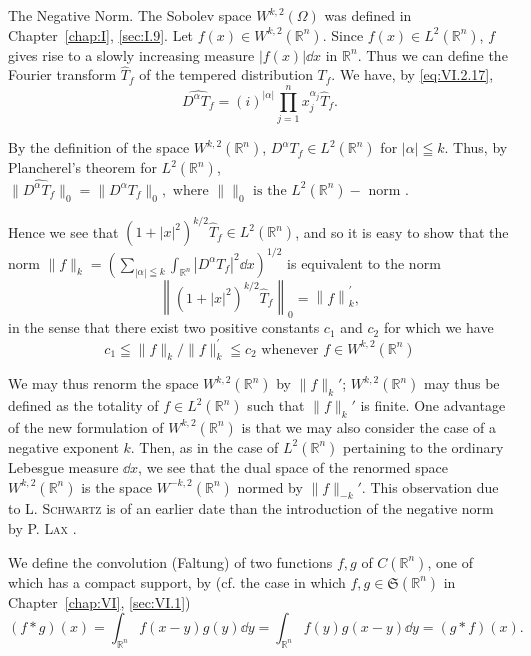 The Negative Norm. The Sobolev space $W^{k,2}(\Omega)$ was defined in Chapter~\ref{chap:I}, \ref{sec:I.9}. Let $f(x) \in W^{k,2}(\mathbb{R}^{n})$. Since $f(x) \in L^2(\mathbb{R}^{n})$, $f$ gives rise to a slowly increasing measure $|f(x)| \dd x$ in $\mathbb{R}^{n}$. Thus we can define the Fourier transform $\hat{T}_f$ of the tempered distribution $T_f$. We have, by \eqref{eq:VI.2.17}, 
\[
\widehat {D ^{\alpha} T _{f}} = (i) ^{| \alpha |} \prod\limits_{j=1} ^{n} x _{j} ^ {\alpha_{j}} \hat {T} _{f}.
\]

By the definition of the space $W^{k,2}(\mathbb{R}^{n})$, $D^\alpha T_f \in L^2(\mathbb{R}^{n})$ for $|\alpha| \leqq k$. Thus, by Plancherel's theorem for $L^2(\mathbb{R}^{n})$, 
$\|\widehat{D^{\alpha}T_{f}}\|_{0}=\|D^{\alpha}T_{f}\|_{0}, \text{ where } \|\|_{0} \text{ is the } L^{2}(\mathbb{R}^{n})-\text{ norm }.$ 

Hence we see that $(1 + |x|^2)^{k/2}\hat{T}_f \in L^2(\mathbb{R}^{n})$, and so it is easy to show that the norm $\|f\|_k = \left(\sum\limits_{|\alpha| \leqq k} \int_{\mathbb{R}^{n}} |D^\alpha T_f|^2 \dd x\right)^{1/2}$ is equivalent to the norm 
\begin{equation}\label{eq:VI.2.30}
\left\| (1 + | x | ^{2}) ^{k/2} \hat {T} _{f} \right\| _{0} = \left\| f \right\| _{k} ^{\prime},
\end{equation}
in the sense that there exist two positive constants $c_{1}$ and $c_{2}$ for which we have 
\[
c _{1} \leqq \| f \| _{k} / \| f \| _{k} ^{\prime} \leqq c _{2} \text{ whenever } f \in W ^{k,2} (\mathbb{R}^{n})
\]

We may thus renorm the space $W^{k,2}(\mathbb{R}^{n})$ by $\|f\|_k'$; $W^{k,2}(\mathbb{R}^{n})$ may thus be defined as the totality of $f \in L^2(\mathbb{R}^{n})$ such that $\|f\|_k'$ is finite. One advantage of the new formulation of $W^{k,2}(\mathbb{R}^{n})$ is that we may also consider the case of a negative exponent $k$. Then, as in the case of $L^2(\mathbb{R}^{n})$ pertaining to the ordinary Lebesgue measure $\dd x$, we see that the dual space of the renormed space $W^{k,2}(\mathbb{R}^{n})$ is the space $W^{-k,2}(\mathbb{R}^{n})$ normed by $\|f\|_{-k}'$. This observation due to L. \textsc{Schwartz} \cite{schwartz298} is of an earlier date than the introduction of the negative norm by P. \textsc{Lax} \cite{lewy172}. 


\label{sec:VI.3}

We define the convolution (Faltung) of two functions $f, g$ of $C(\mathbb{R}^{n})$, one of which has a compact support, by (cf. the case in which $f, g \in \mathfrak{S}(\mathbb{R}^{n})$ in Chapter~\ref{chap:VI}, \ref{sec:VI.1}) 
\begin{equation}\label{eq:VI.3.1}
(f * g) (x) = \int_ {\mathbb{R}^{n}} f (x - y) g (y) \dd y = \int_ {\mathbb{R}^{n}} f (y) g (x - y) \dd y = (g * f) (x).
\end{equation}

